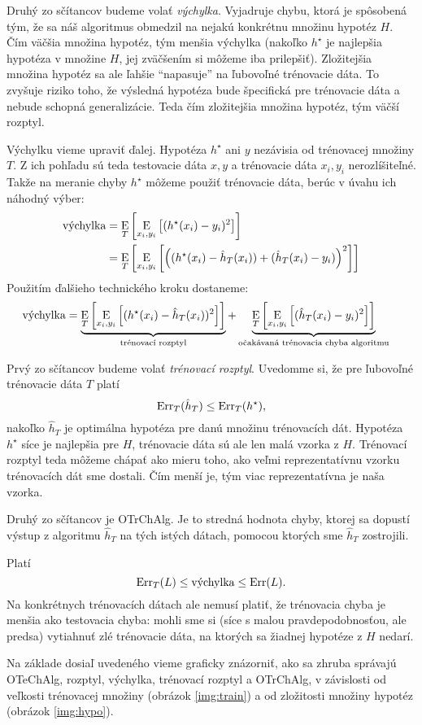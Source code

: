 Druhý zo sčítancov budeme volať \emph{výchylka}. Vyjadruje chybu, ktorá
je spôsobená tým, že sa náš algoritmus obmedzil na nejakú konkrétnu
množinu hypotéz $H$. Čím väčšia množina hypotéz, tým menšia výchylka
(nakoľko $h^\star$ je najlepšia hypotéza v množine $H$, jej zväčšením
si môžeme iba prilepšiť). Zložitejšia množina hypotéz sa ale ľahšie
``napasuje'' na ľubovoľné trénovacie dáta. To zvyšuje riziko toho,
že výsledná hypotéza bude špecifická pre trénovacie dáta a nebude
schopná generalizácie. Teda čím zložitejšia množina hypotéz, tým
väčší rozptyl.

Výchylku vieme upraviť ďalej. Hypotéza $h^\star$ ani $y$ nezávisia
od trénovacej množiny $T$. Z ich pohľadu sú teda testovacie dáta $x, y$
a trénovacie dáta $x_i, y_i$ nerozlíšiteľné. Takže na meranie chyby
$h^\star$ môžeme použiť trénovacie dáta, berúc v úvahu ich náhodný
výber:
\begin{align}
  \vVychylka
    &= \E_T \left[ \E_{x_i, y_i} \left[ (h^\star(x_i) - y_i)^2 \right] \right] \\
    &= \E_T \left[ \E_{x_i, y_i} \left[ \left( (h^\star(x_i) - \hat{h}_T(x_i)) + (\hat{h}_T(x_i) - y_i) \right)^2 \right] \right]
\end{align}
Použitím ďalšieho technického kroku dostaneme:
\begin{align}
  \vVychylka &= \underbrace{\E_T \left[ \E_{x_i, y_i} \left[ (h^\star(x_i) - \hat{h}_T(x_i))^2 \right] \right]}_\vRozptylT
    + \underbrace{\E_T \left[ \E_{x_i, y_i} \left[ (\hat{h}_T(x_i) - y_i)^2 \right] \right]}_\vOTrChAlg
\end{align}

Prvý zo sčítancov budeme volať \emph{trénovací rozptyl}.
Uvedomme si, že pre ľubovoľné trénovacie dáta $T$ platí
$$\Err_T(\hat{h}_T) \leq \Err_T(h^\star),$$
nakoľko $\hat{h}_T$ je optimálna hypotéza pre danú množinu trénovacích
dát. Hypotéza $h^\star$ síce je najlepšia pre $H$, trénovacie dáta sú ale len
malá vzorka z $H$.
Trénovací rozptyl teda môžeme chápať ako mieru toho, ako veľmi
reprezentatívnu vzorku trénovacích dát sme dostali. Čím menší je,
tým viac reprezentatívna je naša vzorka.

\medskip

Druhý zo sčítancov je OTrChAlg. Je to stredná hodnota
chyby, ktorej sa dopustí výstup z algoritmu $\hat{h}_T$ na tých istých
dátach, pomocou ktorých sme $\hat{h}_T$ zostrojili.

\medskip

Platí
$$ \Err_T(L) \leq \vVychylka \leq \Err(L). $$
Na konkrétnych trénovacích dátach ale nemusí platiť, že trénovacia
chyba je menšia ako testovacia chyba: mohli sme si (síce s malou
pravdepodobnosťou, ale predsa) vytiahnuť zlé trénovacie dáta, na
ktorých sa žiadnej hypotéze z $H$ nedarí.

\medskip

Na základe dosiaľ uvedeného vieme graficky znázorniť, ako sa zhruba správajú
OTeChAlg, rozptyl, výchylka, trénovací rozptyl a OTrChAlg, v závislosti
od veľkosti trénovacej množiny (obrázok \ref{img:train}) a od zložitosti
množiny hypotéz (obrázok \ref{img:hypo}).
